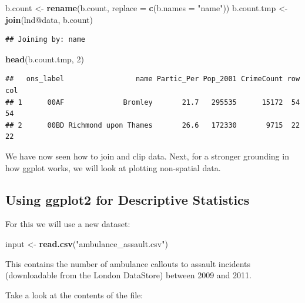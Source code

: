 \documentclass[]{article}
\newenvironment{Shaded}{}{}
\newcommand{\KeywordTok}[1]{\textcolor[rgb]{0.00,0.44,0.13}{\textbf{{#1}}}}
\newcommand{\DataTypeTok}[1]{\textcolor[rgb]{0.56,0.13,0.00}{{#1}}}
\newcommand{\DecValTok}[1]{\textcolor[rgb]{0.25,0.63,0.44}{{#1}}}
\newcommand{\StringTok}[1]{\textcolor[rgb]{0.25,0.44,0.63}{{#1}}}
\newcommand{\NormalTok}[1]{{#1}}
\begin{document}
\begin{Shaded}
\begin{Highlighting}[]
\NormalTok{b.count <- }\KeywordTok{rename}\NormalTok{(b.count, }\DataTypeTok{replace =} \KeywordTok{c}\NormalTok{(}\DataTypeTok{b.names =} \StringTok{"name"}\NormalTok{))}
\NormalTok{b.count.tmp <- }\KeywordTok{join}\NormalTok{(lnd@data, b.count)}
\end{Highlighting}
\end{Shaded}
\begin{verbatim}
## Joining by: name
\end{verbatim}
\begin{Shaded}
\begin{Highlighting}[]
\KeywordTok{head}\NormalTok{(b.count.tmp, }\DecValTok{2}\NormalTok{)}
\end{Highlighting}
\end{Shaded}
\begin{verbatim}
##   ons_label                 name Partic_Per Pop_2001 CrimeCount row col
## 1      00AF              Bromley       21.7   295535      15172  54  54
## 2      00BD Richmond upon Thames       26.6   172330       9715  22  22
\end{verbatim}
\begin{Shaded}
\end{Shaded}
We have now seen how to join and clip data. Next, for a stronger
grounding in how ggplot works, we will look at plotting non-spatial
data.

\subsection{Using ggplot2 for Descriptive Statistics}

For this we will use a new dataset:

\begin{Shaded}
\begin{Highlighting}[]
\NormalTok{input <- }\KeywordTok{read.csv}\NormalTok{(}\StringTok{"ambulance_assault.csv"}\NormalTok{)}
\end{Highlighting}
\end{Shaded}
This contains the number of ambulance callouts to assault incidents
(downloadable from the London DataStore) between 2009 and 2011.

Take a look at the contents of the file:
\end{document}
